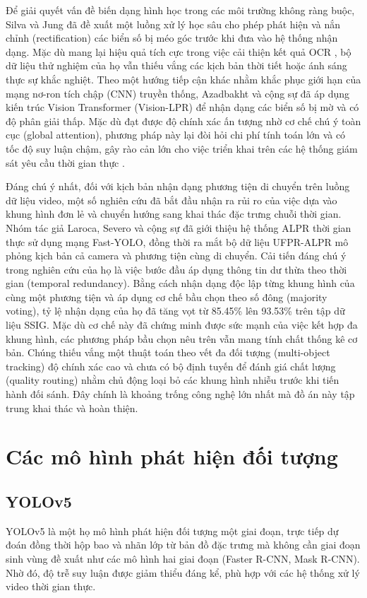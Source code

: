 \documentclass[../DoAn.tex]{subfiles}
\begin{document}
Để giải quyết vấn đề biến dạng hình học trong các môi trường không ràng buộc, Silva và Jung đã đề xuất một luồng xử lý học sâu cho phép phát hiện và nắn chỉnh (rectification) các biển số bị méo góc trước khi đưa vào hệ thống nhận dạng. Mặc dù mang lại hiệu quả tích cực trong việc cải thiện kết quả OCR \cite{silva2018license}, bộ dữ liệu thử nghiệm của họ vẫn thiếu vắng các kịch bản thời tiết hoặc ánh sáng thực sự khắc nghiệt. Theo một hướng tiếp cận khác nhằm khắc phục giới hạn của mạng nơ-ron tích chập (CNN) truyền thống, Azadbakht và cộng sự đã áp dụng kiến trúc Vision Transformer (Vision-LPR) để nhận dạng các biển số bị mờ và có độ phân giải thấp. Mặc dù đạt được độ chính xác ấn tượng nhờ cơ chế chú ý toàn cục (global attention), phương pháp này lại đòi hỏi chi phí tính toán lớn và có tốc độ suy luận chậm, gây rào cản lớn cho việc triển khai trên các hệ thống giám sát yêu cầu thời gian thực \cite{azadbakht2022multipath}.

Đáng chú ý nhất, đối với kịch bản nhận dạng phương tiện di chuyển trên luồng dữ liệu video, một số nghiên cứu đã bắt đầu nhận ra rủi ro của việc dựa vào khung hình đơn lẻ và chuyển hướng sang khai thác đặc trưng chuỗi thời gian. Nhóm tác giả Laroca, Severo và cộng sự \cite{laroca2018robust}
 đã giới thiệu hệ thống ALPR thời gian thực sử dụng mạng Fast-YOLO, đồng thời ra mắt bộ dữ liệu UFPR-ALPR mô phỏng kịch bản cả camera và phương tiện cùng di chuyển. Cải tiến đáng chú ý trong nghiên cứu của họ là việc bước đầu áp dụng thông tin dư thừa theo thời gian (temporal redundancy). Bằng cách nhận dạng độc lập từng khung hình của cùng một phương tiện và áp dụng cơ chế bầu chọn theo số đông (majority voting), tỷ lệ nhận dạng của họ đã tăng vọt từ 85.45\% lên 93.53\% trên tập dữ liệu SSIG. Mặc dù cơ chế này đã chứng minh được sức mạnh của việc kết hợp đa khung hình, các phương pháp bầu chọn nêu trên vẫn mang tính chất thống kê cơ bản. Chúng thiếu vắng một thuật toán theo vết đa đối tượng (multi-object tracking) độ chính xác cao và chưa có bộ định tuyến để đánh giá chất lượng (quality routing) nhằm chủ động loại bỏ các khung hình nhiễu trước khi tiến hành đối sánh. Đây chính là khoảng trống công nghệ lớn nhất mà đồ án này tập trung khai thác và hoàn thiện.
\section{Các mô hình phát hiện đối tượng}
\label{section:2.3}
\subsection{YOLOv5}
\label{subsection:2.3.1}
YOLOv5 là một họ mô hình phát hiện đối tượng một giai đoạn, trực tiếp dự đoán đồng thời hộp bao và nhãn lớp từ bản đồ đặc trưng mà không cần giai đoạn sinh vùng đề xuất như các mô hình hai giai đoạn (Faster R-CNN, Mask R-CNN). Nhờ đó, độ trễ suy luận được giảm thiểu đáng kể, phù hợp với các hệ thống xử lý video thời gian thực.
\end{document}
